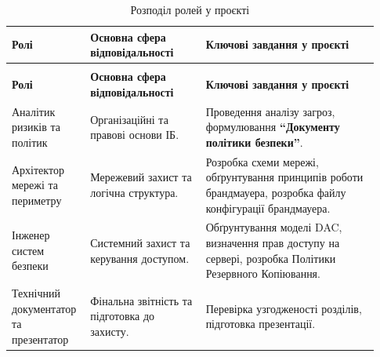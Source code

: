 \begin{longtable}{|
    >{\raggedright\arraybackslash}p{0.18\linewidth}| %
    >{\raggedright\arraybackslash}p{0.3\linewidth}| %
    >{\raggedright\arraybackslash}p{0.45\linewidth}| %
    }
    
    \caption{Розподіл ролей у проєкті}
    \label{RolesPproject} \\

    \hline
    \textbf{Ролі} & \textbf{Основна сфера відповідальності} & \textbf{Ключові завдання у проєкті} \\
    \hline
    \endfirsthead

    \multicolumn{3}{r}{{\normalsize Продовження табл. \thetable}} \\
    \hline

    \hline
    \textbf{Ролі} & \textbf{Основна сфера відповідальності} & \textbf{Ключові завдання у проєкті} \\
    \hline
    \endhead

    \hline
    \endlastfoot

    Аналітик ризиків та політик & 
    Організаційні та правові основи ІБ. & 
    \begin{minipage}[t]{\linewidth}
    \vspace{1mm}
    Проведення аналізу загроз, формулювання \textbf{``Документу політики безпеки''}.
    \vspace{1mm}
    \end{minipage} \\
    \hline

    Архітектор мережі та периметру & 
    Мережевий захист та логічна структура. & 
    \begin{minipage}[t]{\linewidth}
    \vspace{1mm}
    Розробка схеми мережі, обґрунтування принципів роботи брандмауера, розробка файлу конфігурації брандмауера.
    \vspace{1mm}
    \end{minipage} \\
    \hline

    Інженер систем безпеки & 
    Системний захист та керування доступом. & 
    \begin{minipage}[t]{\linewidth}
    \vspace{1mm}
    Обґрунтування моделі DAC, визначення прав доступу на сервері, розробка Політики Резервного Копіювання.
    \vspace{1mm}
    \end{minipage} \\
    \hline

    Технічний документатор та презентатор & 
    Фінальна звітність та підготовка до захисту. & 
    Перевірка узгодженості розділів, підготовка презентації. \\

\end{longtable}


